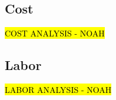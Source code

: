 \documentclass[openbib,letterpaper,10pt]{article}
\begin{document}
\begin{spacing}{1.15}
\subsection{Cost}
\hl{COST ANALYSIS - NOAH}

\subsection{Labor}
\hl{LABOR ANALYSIS - NOAH}




\clearpage
\end{spacing}
\end{document}
